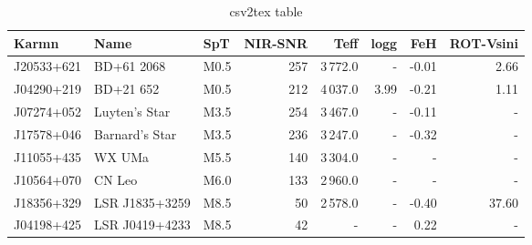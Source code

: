 
\begin{table}[h]
    \caption{csv2tex table}
    \begin{tabular}{lllrrrrr}
        \toprule
        Karmn &            Name &   SpT &  NIR-{SNR} &    Teff &  logg &   FeH &  ROT-Vsini \\
        \midrule
        J20533+621 &      BD+61 2068 &  M0.5 &      257 &  3\,772.0 &     - & -0.01 &       2.66 \\
        J04290+219 &       BD+21 652 &  M0.5 &      212 &  4\,037.0 &  3.99 & -0.21 &       1.11 \\
        J07274+052 &   Luyten's Star &  M3.5 &      254 &  3\,467.0 &     - & -0.11 &          - \\
        J17578+046 &  Barnard's Star &  M3.5 &      236 &  3\,247.0 &     - & -0.32 &          - \\
        J11055+435 &          WX UMa &  M5.5 &      140 &  3\,304.0 &     - &     - &          - \\
        J10564+070 &          CN Leo &  M6.0 &      133 &  2\,960.0 &     - &     - &          - \\
        J18356+329 &  LSR J1835+3259 &  M8.5 &       50 &  2\,578.0 &     - & -0.40 &      37.60 \\
        J04198+425 &  LSR J0419+4233 &  M8.5 &       42 &       - &     - &  0.22 &          - \\
    \bottomrule
    \end{tabular}\label{tab:carmenes_selection}
\end{table}
